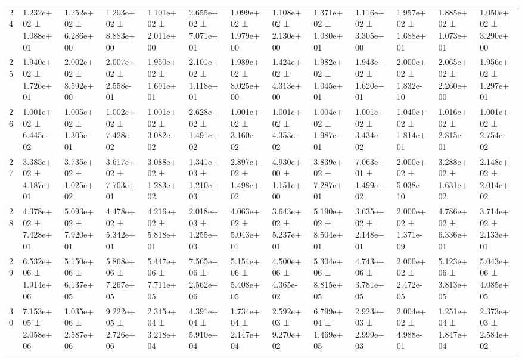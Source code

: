 \begin{table}
\begin{tabular}{lllllllllllll}
24 & 1.232e+02 ± 1.088e+01 & 1.252e+02 ± 6.286e+00 & 1.203e+02 ± 8.883e+00 & 1.101e+02 ± 2.011e+00 & 2.655e+02 ± 7.071e+01 & 1.099e+02 ± 1.979e+00 & 1.108e+02 ± 2.130e+00 & 1.371e+02 ± 1.080e+01 & 1.116e+02 ± 3.305e+00 & 1.957e+02 ± 1.688e+01 & 1.885e+02 ± 1.073e+01 & 1.050e+02 ± 3.290e+00 \\
25 & 1.940e+02 ± 1.726e+01 & 2.002e+02 ± 8.592e+00 & 2.007e+02 ± 2.558e-01 & 1.950e+02 ± 1.691e+01 & 2.101e+02 ± 1.118e+01 & 1.989e+02 ± 8.025e+00 & 1.424e+02 ± 4.313e+00 & 1.982e+02 ± 1.045e+01 & 1.943e+02 ± 1.620e+01 & 2.000e+02 ± 1.832e-10 & 2.065e+02 ± 2.260e+00 & 1.956e+02 ± 1.297e+01 \\
26 & 1.001e+02 ± 6.445e-02 & 1.005e+02 ± 1.305e-01 & 1.002e+02 ± 7.428e-02 & 1.001e+02 ± 3.082e-02 & 2.628e+02 ± 1.491e+02 & 1.001e+02 ± 3.160e-02 & 1.001e+02 ± 4.353e-02 & 1.004e+02 ± 1.987e-01 & 1.001e+02 ± 3.434e-02 & 1.040e+02 ± 1.814e+01 & 1.016e+02 ± 2.815e-01 & 1.001e+02 ± 2.754e-02 \\
27 & 3.385e+02 ± 4.187e+01 & 3.735e+02 ± 1.025e+02 & 3.617e+02 ± 7.703e+01 & 3.088e+02 ± 1.283e+02 & 1.341e+03 ± 1.210e+03 & 2.897e+02 ± 1.498e+02 & 4.930e+00 ± 1.151e+00 & 3.839e+02 ± 7.287e+01 & 7.063e+01 ± 1.499e+02 & 2.000e+02 ± 5.038e-10 & 3.288e+02 ± 1.631e+02 & 2.148e+02 ± 2.014e+02 \\
28 & 4.378e+02 ± 7.428e+01 & 5.093e+02 ± 7.920e+01 & 4.478e+02 ± 5.342e+01 & 4.216e+02 ± 5.818e+01 & 2.018e+03 ± 1.255e+03 & 4.063e+02 ± 5.043e+01 & 3.643e+02 ± 5.237e+01 & 5.190e+02 ± 8.504e+01 & 3.635e+02 ± 2.148e+01 & 2.000e+02 ± 1.371e-09 & 4.786e+02 ± 6.336e+01 & 3.714e+02 ± 2.133e+01 \\
29 & 6.532e+06 ± 1.914e+06 & 5.150e+06 ± 6.137e+05 & 5.868e+06 ± 7.267e+05 & 5.447e+06 ± 7.711e+05 & 7.565e+06 ± 2.562e+06 & 5.154e+06 ± 5.408e+05 & 4.500e+06 ± 4.365e-02 & 5.304e+06 ± 8.815e+05 & 4.743e+06 ± 3.781e+05 & 2.000e+02 ± 2.472e-05 & 5.123e+06 ± 3.813e+05 & 5.043e+06 ± 4.085e+05 \\
30 & 7.153e+05 ± 2.058e+06 & 1.035e+06 ± 2.587e+06 & 9.222e+05 ± 2.726e+06 & 2.345e+04 ± 3.218e+04 & 4.391e+04 ± 5.910e+04 & 1.734e+04 ± 2.147e+04 & 2.592e+03 ± 9.270e+02 & 6.799e+04 ± 1.469e+05 & 2.923e+03 ± 2.999e+03 & 2.004e+02 ± 4.988e-01 & 1.251e+04 ± 1.847e+04 & 2.373e+03 ± 2.584e+02 \\
\bottomrule
\end{tabular}
\end{table}
